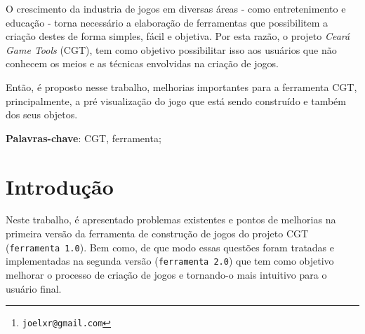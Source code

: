 \documentclass[12pt,oneside,openright,a4paper,english,brazil,sumario=tradicional]{abntex2}
\author{Joel Xavier Rocha\thanks{\texttt{joelxr@gmail.com}}}
\begin{document}
\lstset{
        frame=single,
        showlines=true,
        language=java,
        tabsize=3,
        basicstyle=\scriptsize
        }
\frenchspacing
\imprimircapa
\imprimirfolhaderosto*

%     

% 

\setlength{\absparsep}{18pt}
\begin{resumo}
   O crescimento da industria de jogos em diversas áreas - como entretenimento e educação - torna necessário a elaboração de ferramentas que possibilitem a criação destes de forma simples, fácil e objetiva. Por esta razão, o projeto \emph{Ceará Game Tools} (CGT), tem como objetivo possibilitar isso aos usuários que não conhecem os meios e as técnicas envolvidas na criação de jogos.

   Então, é proposto nesse trabalho, melhorias importantes para a ferramenta CGT, principalmente, a pré visualização do jogo que está sendo construído e também dos seus objetos.

   \vspace{\onelineskip}
   \noindent
   \textbf{Palavras-chave}: CGT, ferramenta;
\end{resumo}
\listoffigures*
\cleardoublepage
{}
\listoftables*
\cleardoublepage
{}
\tableofcontents*
\cleardoublepage
\textual
\chapter{Introdução} %
\label{chap:introducao}
Neste trabalho, é apresentado problemas existentes e pontos de melhorias na primeira versão da ferramenta de construção de jogos do projeto CGT (\texttt{ferramenta 1.0}). Bem como, de que modo essas questões foram tratadas e implementadas na segunda versão (\texttt{ferramenta 2.0}) que tem como objetivo melhorar o processo de criação de jogos e tornando-o mais intuitivo para o usuário final.
\end{document}
